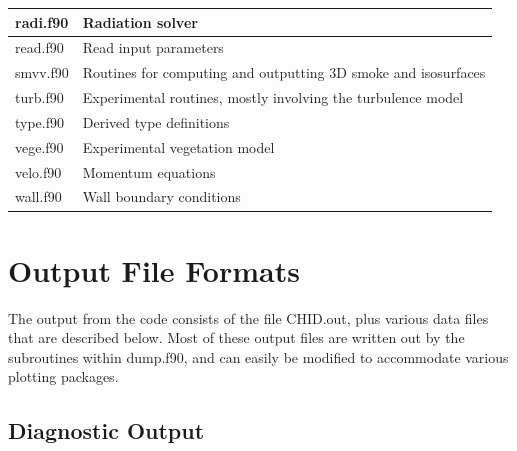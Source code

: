 \documentclass[11pt]{book}
\begin{document}
\begin{table}[ht]
\begin{center}
\begin{tabular}{|l|l|}
radi.f90   & Radiation solver  \\ \hline
read.f90   & Read input parameters \\ \hline
smvv.f90   & Routines for computing and outputting 3D smoke and isosurfaces \\ \hline
turb.f90   & Experimental routines, mostly involving the turbulence model \\ \hline
type.f90   & Derived type definitions \\ \hline
vege.f90   & Experimental vegetation model \\ \hline
velo.f90   & Momentum equations \\ \hline
wall.f90   & Wall boundary conditions \\ \hline
\end{tabular}
\end{center}
\end{table}





\chapter{Output File Formats}

The output from the code consists of the file {\ct CHID.out}, plus various data files that are described below. Most of these output files are written out by the subroutines within {\ct dump.f90}, and can easily be modified to accommodate various plotting packages.

\section{Diagnostic Output}
\label{out:file}
\end{document}
